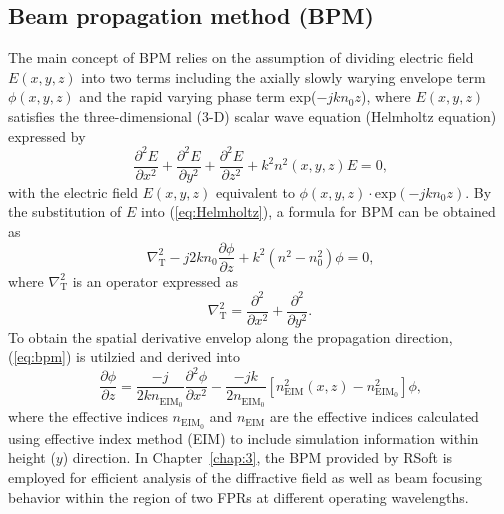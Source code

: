 \subsection{Beam propagation method (BPM)} \label{sec:2.4.1}
    The main concept of BPM \cite{oka-book-bpm} relies on the assumption of dividing electric field $E(x,y,z)$ into two terms including 
    the axially slowly warying envelope term $\phi(x,y,z)$ and the rapid varying phase term exp($-jkn_{0}z$), 
    where $E(x,y,z)$ satisfies the three-dimensional (3-D) scalar wave equation (Helmholtz equation) expressed by 
    \begin{equation}
        \frac{\partial ^2 E}{\partial x^2} + \frac{\partial ^2 E}{\partial y^2} + \frac{\partial ^2 E}{\partial z^2} + 
            k^2 n^2 (x,y,z) E = 0\text{,}\label{eq:Helmholtz}
    \end{equation}
    with the electric field $E(x,y,z)$ equivalent to $\phi(x,y,z)\cdot \text{exp}(-jkn_\text{0}z)$. 
    By the substitution of $E$ into (\ref{eq:Helmholtz}), 
    a formula for BPM can be obtained as 
    \begin{equation}
        \nabla_\text{T}^2 - j2kn_{0}\frac{\partial \phi}{\partial z} + k^2 (n^2 - n_0^2)\phi = 0\text{,}\label{eq:bpm}
    \end{equation}
    where $\nabla_\text{T}^2$ is an operator expressed as 
    \begin{equation}
        \nabla_\text{T}^2 = \frac{\partial^2}{\partial x^2} + \frac{\partial^2}{\partial y^2}\text{.}\label{eq:operator}
    \end{equation}
    To obtain the spatial derivative envelop along the propagation direction, 
    (\ref{eq:bpm}) is utilzied and derived into 
    \begin{equation}
        \frac{\partial \phi}{\partial z} = \frac{-j}{2kn_{\text{EIM}_0}^{}}\frac{\partial^2 \phi}{\partial x^2} - 
            \frac{-jk}{2n_{\text{EIM}_0}^{}}\left[n_\text{EIM}^2 (x,z) - n_{\text{EIM}_0}^2\right]\phi\text{,}\label{eq:bpmz}
    \end{equation}
    where the effective indices $n_{\text{EIM}_0}^{}$ and $n_\text{EIM}^{}$ 
    are the effective indices calculated using effective index method (EIM) 
    to include simulation information within height ($y$) direction. 
    In Chapter~\ref{chap:3}, the BPM provided by RSoft 
    is employed for efficient analysis of the diffractive field as well as beam focusing behavior 
    within the region of two FPRs at different operating wavelengths. 

